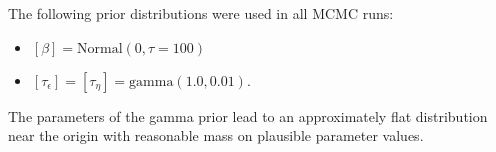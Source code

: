 \documentclass[12pt,fleqn]{article}
\begin{document}
\begin{flushleft}
The following prior distributions were used in all MCMC runs:
\begin{itemize}
  \item $[\beta] = \textrm{Normal}(0,\tau=100)$
  \item $[\tau_\epsilon]=[\tau_\eta]=\textrm{gamma}(1.0,0.01)$.
\end{itemize} 
The parameters of the gamma prior lead to an approximately flat distribution near the origin with reasonable mass on plausible parameter values. 

\renewcommand{\refname}{Literature Cited}
% 



\end{flushleft}
\end{document}
